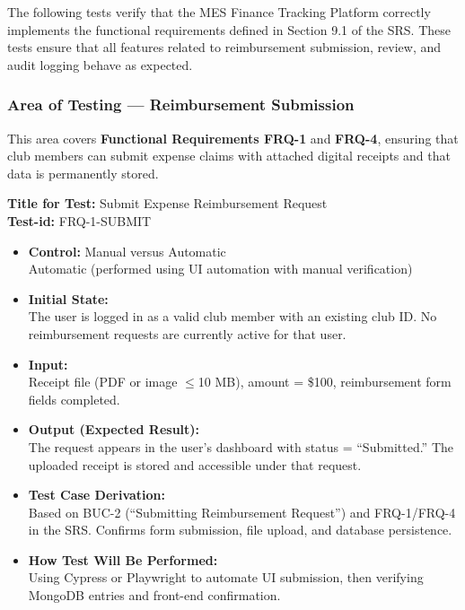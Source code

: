 \documentclass[12pt, titlepage]{article}
\begin{document}

The following tests verify that the MES Finance Tracking Platform correctly implements the functional requirements defined in Section 9.1 of the SRS. 
These tests ensure that all features related to reimbursement submission, review, and audit logging behave as expected.

\subsubsection{Area of Testing — Reimbursement Submission}

This area covers \textbf{Functional Requirements FRQ-1} and \textbf{FRQ-4}, ensuring that club members can submit expense claims with attached digital receipts and that data is permanently stored.

\textbf{Title for Test:} Submit Expense Reimbursement Request \\
\textbf{Test-id:} FRQ-1-SUBMIT

\begin{itemize}
    \item \textbf{Control:} Manual versus Automatic \\
    Automatic (performed using UI automation with manual verification)
    \item \textbf{Initial State:} \\
    The user is logged in as a valid club member with an existing club ID. No reimbursement requests are currently active for that user.
    \item \textbf{Input:} \\
    Receipt file (PDF or image $\leq$10 MB), amount = \$100, reimbursement form fields completed.
    \item \textbf{Output (Expected Result):} \\
    The request appears in the user’s dashboard with status = ``Submitted.'' The uploaded receipt is stored and accessible under that request.
    \item \textbf{Test Case Derivation:} \\
    Based on BUC-2 (``Submitting Reimbursement Request'') and FRQ-1/FRQ-4 in the SRS. Confirms form submission, file upload, and database persistence.
    \item \textbf{How Test Will Be Performed:} \\
    Using Cypress or Playwright to automate UI submission, then verifying MongoDB entries and front-end confirmation.
\end{itemize}
\end{document}
